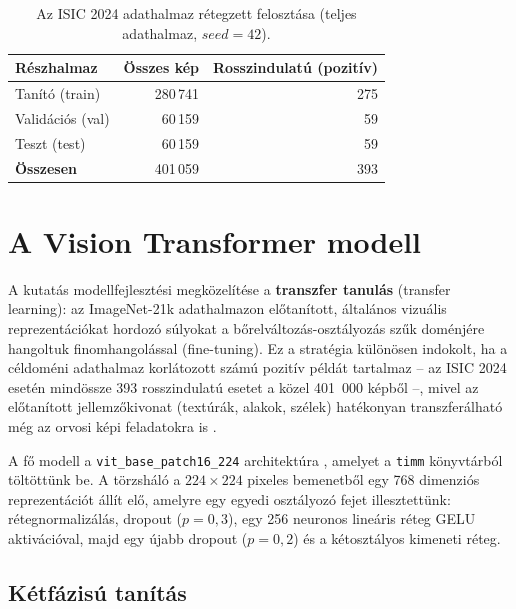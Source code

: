 \begin{table}[H]
  \centering
  \caption{Az ISIC 2024 adathalmaz rétegzett felosztása (teljes adathalmaz, $seed=42$).}
  \label{tab:split}
  \begin{tabular}{lrr}
    \hline
    \textbf{Részhalmaz} & \textbf{Összes kép} & \textbf{Rosszindulatú (pozitív)} \\
    \hline
    Tanító (train)      & 280\,741 & 275 \\
    Validációs (val)    & 60\,159  & 59  \\
    Teszt (test)        & 60\,159  & 59  \\
    \hline
    \textbf{Összesen}   & 401\,059 & 393 \\
    \hline
  \end{tabular}
\end{table}

\section{A Vision Transformer modell}

A kutatás modellfejlesztési megközelítése a \textbf{transzfer tanulás} (transfer
learning): az ImageNet-21k adathalmazon előtanított, általános vizuális
reprezentációkat hordozó súlyokat a bőrelváltozás-osztályozás szűk doménjére
hangoltuk finomhangolással (fine-tuning). Ez a stratégia különösen indokolt, ha
a céldoméni adathalmaz korlátozott számú pozitív példát tartalmaz -- az ISIC 2024
esetén mindössze 393 rosszindulatú esetet a közel 401~000 képből --, mivel az
előtanított jellemzőkivonat (textúrák, alakok, szélek) hatékonyan transzferálható
még az orvosi képi feladatokra is \cite{raghu2019transfusion}.

A fő modell a \texttt{vit\_base\_patch16\_224} architektúra
\cite{dosovitskiy2021vit}, amelyet a \texttt{timm} könyvtárból
\cite{wightman2019timm} töltöttünk be. A törzsháló a
$224 \times 224$ pixeles bemenetből egy 768 dimenziós reprezentációt állít elő,
amelyre egy egyedi osztályozó fejet illesztettünk: rétegnormalizálás, dropout
($p=0{,}3$), egy 256 neuronos lineáris réteg GELU aktivációval, majd egy újabb
dropout ($p=0{,}2$) és a kétosztályos kimeneti réteg.

\subsection{Kétfázisú tanítás}

